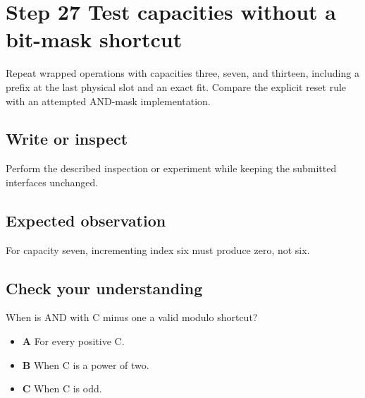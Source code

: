 \section{Step 27 Test capacities without a bit-mask shortcut}\label{ring-s27}

Repeat wrapped operations with capacities three, seven, and thirteen, including a prefix at the last physical slot and an exact fit. Compare the explicit reset rule with an attempted AND-mask implementation.

\subsection{Write or inspect}
Perform the described inspection or experiment while keeping the submitted interfaces unchanged.

\subsection{Expected observation}
For capacity seven, incrementing index six must produce zero, not six.

\subsection{Check your understanding}
When is AND with C minus one a valid modulo shortcut?

\begin{itemize}
  \item \textbf{A} For every positive C.
  \item \textbf{B} When C is a power of two.
  \item \textbf{C} When C is odd.
\end{itemize}
